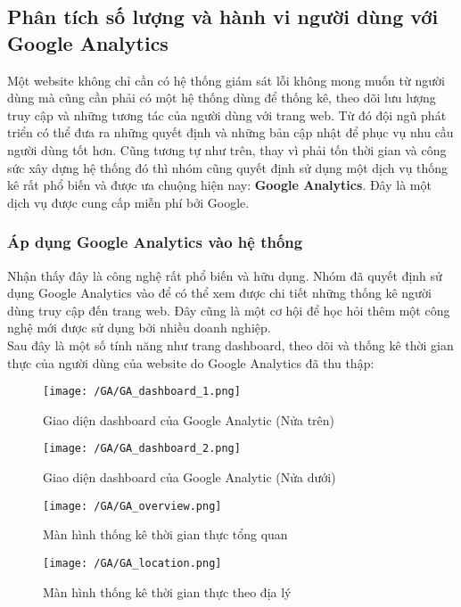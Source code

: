 			 	\subsection{Phân tích số lượng và hành vi người dùng với Google Analytics}
			 	Một website không chỉ cần có hệ thống giám sát lỗi không mong muốn từ người dùng mà cũng cần phải có một hệ thống dùng để thống kê, theo dõi lưu lượng truy cập và những tương tác của người dùng với trang web. Từ đó đội ngũ phát triển có thể đưa ra những quyết định và những bản cập nhật để phục vụ nhu cầu người dùng tốt hơn. Cũng tương tự như trên, thay vì phải tốn thời gian và công sức xây dựng hệ thống đó thì nhóm cũng quyết định sử dụng một dịch vụ thống kê rất phổ biến và được ưa chuộng hiện nay: \textbf{Google Analytics}. Đây là một dịch vụ được cung cấp miễn phí bởi Google.
			 	
			 	\subsubsection{Áp dụng Google Analytics vào hệ thống}
			 	Nhận thấy đây là công nghệ rất phổ biến và hữu dụng. Nhóm đã quyết định sử dụng Google Analytics vào để có thể xem được chi tiết những thống kê người dùng truy cập đến trang web. Đây cũng là một cơ hội để học hỏi thêm một công nghệ mới được sử dụng bởi nhiều doanh nghiệp.\\
			 	
			 	Sau đây là một số tính năng như trang dashboard, theo dõi và thống kê thời gian thực của người dùng của website do Google Analytics đã thu thập:
			 	
			 	\begin{figure}[H]
			 		\texttt{[image: /GA/GA\_dashboard\_1.png]}
			 		\centering
			 		\caption{Giao diện dashboard của Google Analytic (Nửa trên)}
			 	\end{figure}
		 	
		 		\begin{figure}[H]
		 			\texttt{[image: /GA/GA\_dashboard\_2.png]}
		 			\centering
			 		\caption{Giao diện dashboard của Google Analytic (Nửa dưới)}
		 		\end{figure}
			 	
			 	\begin{figure}[H]
			 		\texttt{[image: /GA/GA\_overview.png]}
			 		\centering
			 		\caption{Màn hình thống kê thời gian thực tổng quan}
			 	\end{figure}
			 	
			 	\begin{figure}[H]
			 		\texttt{[image: /GA/GA\_location.png]}
			 		\centering
			 		\caption{Màn hình thống kê thời gian thực theo địa lý}
			 	\end{figure}
			 	
